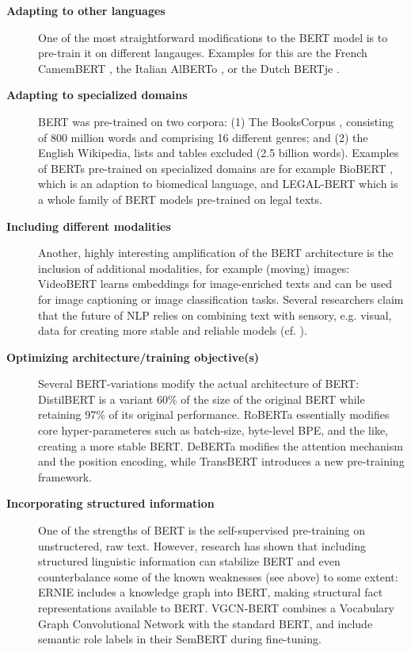 \begin{description}
  \item[\textbf{Adapting to other languages}] One of the most straightforward modifications to the BERT model is to pre-train it on different langauges. Examples for this are the French CamemBERT \cite{martin2019camembert}, the Italian AlBERTo \cite{polignano2019alberto}, or the Dutch BERTje \cite{de2019bertje}.
  \item[\textbf{Adapting to specialized domains}] BERT was pre-trained on two corpora: (1) The BooksCorpus \citep{zhu2015aligning}, consisting of 800 million words and comprising 16 different genres; and (2) the English Wikipedia, lists and tables excluded (2.5 billion words).
  Examples of BERTs pre-trained on specialized domains are for example BioBERT \cite{lee2020biobert}, which  is an adaption to biomedical language, and LEGAL-BERT \cite{chalkidis2020legalbert} which is a whole family of BERT models pre-trained on legal texts.
  \item[\textbf{Including different modalities}] Another, highly interesting amplification of the BERT architecture is the inclusion of additional modalities, for example (moving) images: VideoBERT \cite{sun2019videobert} learns embeddings for image-enriched texts and can be used for image captioning or image classification tasks.
  Several researchers claim that the future of NLP relies on combining text with sensory, e.g. visual, data for creating more stable and reliable models (cf. \citep{bisk2020experience, bender2021dangers}).
  \item[\textbf{Optimizing architecture/training objective(s)}] Several BERT-variations modify the actual architecture of BERT:  DistilBERT \cite{sanh2019distilbert} is a variant 60\% of the size of the original BERT while retaining 97\% of its original performance.
  RoBERTa \cite{liu2019roberta} essentially modifies core hyper-parameteres such as batch-size, byte-level BPE, and the like, creating a more stable BERT.
  DeBERTa \cite{he2020deberta} modifies the attention mechanism and the position encoding, while TransBERT \cite{li2021transbert} introduces a new pre-training framework.
  \item[\textbf{Incorporating structured information}] One of the strengths of BERT is the self-supervised pre-training on unstructered, raw text. However, research has shown that including structured linguistic information can stabilize BERT and even counterbalance some of the known weaknesses (see above) to some extent:
  ERNIE \cite{sun2019ernie} includes a knowledge graph into BERT, making structural fact representations available to BERT.
  VGCN-BERT \cite{lu2020vgcn} combines a Vocabulary Graph Convolutional Network with the standard BERT, and \cite{zhang2019semantics} include semantic role labels in their SemBERT during fine-tuning.
\end{description}


